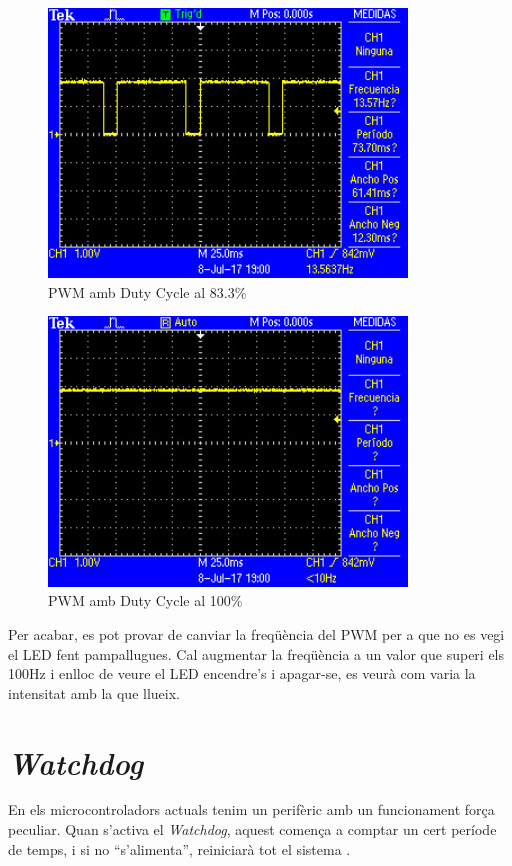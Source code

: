 \begin{figure}
 \centering
 \includegraphics[width=0.85\textwidth, keepaspectratio]{imatges/DutyCycle3.png}
 \caption{PWM amb Duty Cycle al 83.3\%}
 \label{fig:DutyCycle3}
\end{figure}

\begin{figure}
 \centering
 \includegraphics[width=0.85\textwidth, keepaspectratio]{imatges/DutyCycle4.png}
 \caption{PWM amb Duty Cycle al 100\%}
 \label{fig:DutyCycle4}
\end{figure}

Per acabar, es pot provar de canviar la freqüència del \gls{PWM} per a que no es vegi el LED fent pampallugues. Cal augmentar la freqüència a un valor que superi els 100Hz i enlloc de veure el LED encendre's i apagar-se, es veurà com varia la intensitat amb la que llueix.

\chapter{\em Watchdog}
\label{sec:Watchdog}
En els microcontroladors actuals tenim un perifèric amb un funcionament força peculiar. Quan s'activa el {\em \gls{Watchdog}}, aquest comença a comptar un cert període de temps, i si no “s'alimenta”, reiniciarà tot el sistema \cite[123]{EFM32GRM}\cite[709]{STM32F4RM}.

